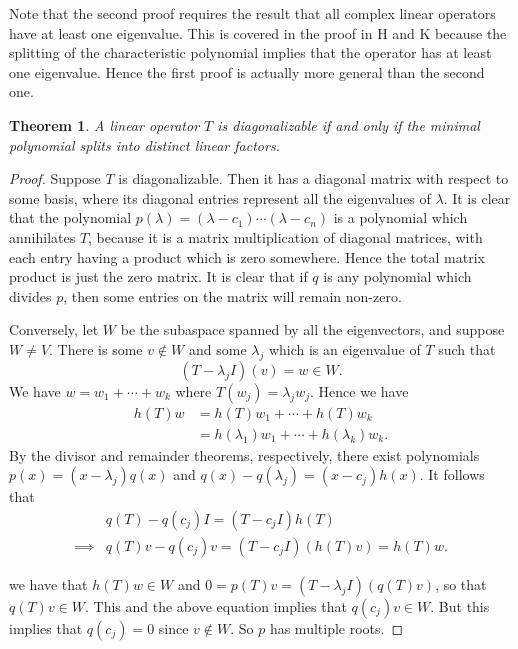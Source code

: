 \documentclass[12pt]{article}
\theoremstyle{plain}
\newtheorem{thm}{Theorem}
\theoremstyle{definition}
\begin{document}
Note that the second proof requires the result that all complex linear operators have at least one eigenvalue. This is covered in the proof in H and K because the splitting of the characteristic polynomial implies that the operator has at least one eigenvalue. Hence the first proof is actually more general than the second one.

\begin{thm}
A linear operator $T$ is diagonalizable if and only if the minimal polynomial splits into distinct linear factors.
\end{thm}
\begin{proof}
Suppose $T$ is diagonalizable. Then it has a diagonal matrix with respect to some basis, where its diagonal entries represent all the eigenvalues of $\lambda$. It is clear that the polynomial $p(\lambda) = (\lambda - c_1)\cdots(\lambda - c_n)$ is a polynomial which annihilates $T$, because it is a matrix multiplication of diagonal matrices, with each entry having a product which is zero somewhere. Hence the total matrix product is just the zero matrix. It is clear that if $q$ is any polynomial which divides $p$, then some entries on the matrix will remain non-zero.

Conversely, let $W$ be the subaspace spanned by all the eigenvectors, and suppose $W \neq V$. There is some $v \not\in W$ and some $\lambda_j$ which is an eigenvalue of $T$ such that 
\[(T - \lambda_j I)(v) = w \in W.\]
We have $w = w_1 + \cdots + w_k$ where $T(w_j) = \lambda_jw_j$. Hence we have
\begin{align*}
h(T)w &= h(T)w_1 + \cdots + h(T)w_k \\
		 &= h(\lambda_1)w_1 + \cdots + h(\lambda_k)w_k.
\end{align*}
By the divisor and remainder theorems, respectively, there exist polynomials $p(x) = (x - \lambda_j)q(x)$ and $q(x) - q(\lambda_j) = (x - c_j)h(x)$. It follows that
\begin{align*}
& q(T) - q(c_j)I = (T - c_jI)h(T) \\
		\implies & q(T)v - q(c_j)v = (T - c_jI)(h(T)v) = h(T)w.
\end{align*}

we have that $h(T)w \in W$ and $0 = p(T)v = (T - \lambda_j I)(q(T)v)$, so that $q(T)v \in W$. This and the above equation implies that $q(c_j)v \in W$. But this implies that $q(c_j) = 0$ since $v \not\in W$. So $p$ has multiple roots.
\end{proof}
\end{document}
